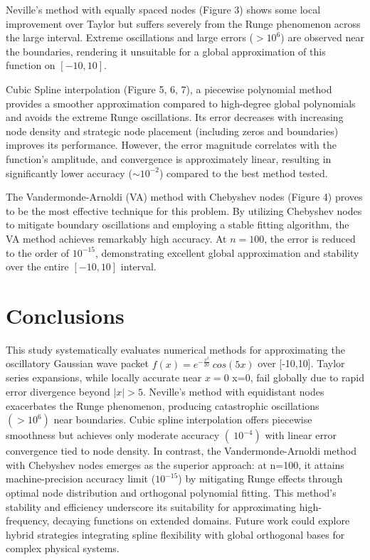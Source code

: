 \documentclass[11pt]{article}
\begin{document}
Neville's method with equally spaced nodes (Figure 3) shows some local improvement over Taylor but suffers severely from the Runge 
phenomenon across the large interval. Extreme oscillations and large errors ($>10^6$) are observed near the boundaries, rendering it 
unsuitable for a global approximation of this function on $[-10, 10]$.

Cubic Spline interpolation (Figure 5, 6, 7), a piecewise polynomial method provides a smoother approximation compared to 
high-degree global polynomials and avoids the extreme Runge oscillations. Its error decreases with increasing node density and strategic 
node placement (including zeros and boundaries) improves its performance. However, the error magnitude correlates with the function's 
amplitude, and convergence is approximately linear, resulting in significantly lower accuracy ($\sim 10^{-2}$) compared to the best method 
tested.

The Vandermonde-Arnoldi (VA) method with Chebyshev nodes (Figure 4) proves to be the most effective 
technique for this problem. By utilizing Chebyshev nodes to mitigate boundary oscillations and employing a stable 
fitting algorithm, the VA method achieves remarkably high accuracy. At $n=100$, the error is reduced to the order of $10^{-15}$, 
demonstrating excellent global approximation and stability over the entire $[-10, 10]$ interval.



\section{Conclusions}
This study systematically evaluates numerical methods for approximating the oscillatory Gaussian wave packet 
$f(x)=e^{-\frac{x^{2}}{20}}\ cos(5x)$ over [-10,10]. Taylor series expansions, while locally accurate near $x=0$
x=0, fail globally due to rapid error divergence beyond $|x|>5$. Neville's method with equidistant nodes exacerbates 
the Runge phenomenon, producing catastrophic oscillations $(>10^{6})$ near boundaries. Cubic spline interpolation offers 
piecewise smoothness but achieves only moderate accuracy $(~10^{-4})$ with linear error convergence tied to node density. 
In contrast, the Vandermonde-Arnoldi method with Chebyshev nodes emerges as the superior approach: at n=100, 
it attains machine-precision accuracy limit ($10^{-15}$) by mitigating Runge effects through optimal node distribution 
and orthogonal polynomial fitting. This method's stability and efficiency underscore its suitability for approximating 
high-frequency, decaying functions on extended domains. Future work could explore hybrid strategies integrating spline 
flexibility with global orthogonal bases for complex physical systems.
\end{document}
